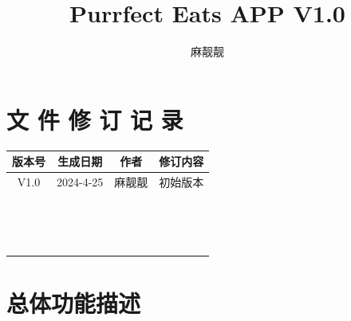 \documentclass{mancls}%
\title{Purrfect Eats APP V1.0}
\author{麻靓靓} %
\begin{document}
\section*{文 件 修 订 记 录}


\begin{longtable}{|c|c|c|c|}
  \hline
  \textbf{版本号} & \textbf{生成日期} & \textbf{作者} & \textbf{修订内容} \\
  \hline
  V1.0         & 2024-4-25     & 麻靓靓         & 初始版本          \\
  \hline
               &               &             &               \\
  \hline
               &               &             &               \\
  \hline
               &               &             &               \\
  \hline
               &               &             &               \\
  \hline
               &               &             &               \\
  \hline
               &               &             &               \\
  \hline
               &               &             &               \\
  \hline
               &               &             &               \\
  \hline
               &               &             &               \\
  \hline
               &               &             &               \\
  \hline
               &               &             &               \\
  \hline
               &               &             &               \\
  \hline
               &               &             &               \\
  \hline
               &               &             &               \\
  \hline
               &               &             &               \\
  \hline
\end{longtable}
\pagebreak

\section{总体功能描述}
\end{document}

